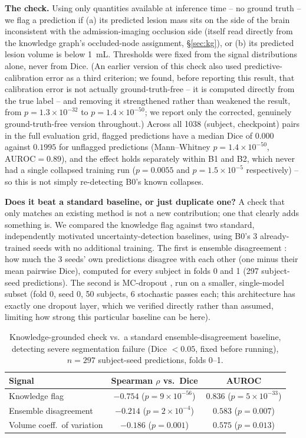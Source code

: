 \textbf{The check.} Using only quantities available at inference time -- no ground truth -- we flag a prediction if (a) its predicted lesion mass sits on the side of the brain inconsistent with the admission-imaging occlusion side (itself read directly from the knowledge graph's occluded-node assignment, \S\ref{sec:kg}), or (b) its predicted lesion volume is below 1~mL. Thresholds were fixed from the signal distributions alone, never from Dice. (An earlier version of this check also used predictive-calibration error as a third criterion; we found, before reporting this result, that calibration error is not actually ground-truth-free -- it is computed directly from the true label -- and removing it strengthened rather than weakened the result, from $p=1.3\times10^{-32}$ to $p=1.4\times10^{-50}$; we report only the corrected, genuinely ground-truth-free version throughout.) Across all 1038 (subject, checkpoint) pairs in the full evaluation grid, flagged predictions have a median Dice of $0.000$ against $0.1995$ for unflagged predictions (Mann--Whitney $p=1.4\times10^{-50}$, $\mathrm{AUROC}=0.89$), and the effect holds separately within B1 and B2, which never had a single collapsed training run ($p=0.0055$ and $p=1.5\times10^{-5}$ respectively) -- so this is not simply re-detecting B0's known collapses.

\textbf{Does it beat a standard baseline, or just duplicate one?} A check that only matches an existing method is not a new contribution; one that clearly adds something is. We compared the knowledge flag against two standard, independently motivated uncertainty-detection baselines, using B0's 3 already-trained seeds with no additional training. The first is ensemble disagreement \cite{lakshminarayanan2017}: how much the 3 seeds' own predictions disagree with each other (one minus their mean pairwise Dice), computed for every subject in folds 0 and 1 (297 subject-seed predictions). The second is MC-dropout \cite{gal2016dropout}, run on a smaller, single-model subset (fold 0, seed 0, 50 subjects, 6 stochastic passes each; this architecture has exactly one dropout layer, which we verified directly rather than assumed, limiting how strong this particular baseline can be here).

\begin{table}[t]
\centering
\caption{Knowledge-grounded check vs.\ a standard ensemble-disagreement baseline, detecting severe segmentation failure (Dice $<0.05$, fixed before running), $n=297$ subject-seed predictions, folds 0--1.}
\label{tab:faildetect}
\begin{tabular}{lcc}
\toprule
\textbf{Signal} & \textbf{Spearman $\rho$ vs.\ Dice} & \textbf{AUROC} \\
\midrule
Knowledge flag & $-0.754$ ($p=9\times10^{-56}$) & $\mathbf{0.836}$ ($p=5\times10^{-33}$) \\
Ensemble disagreement & $-0.214$ ($p=2\times10^{-4}$) & $0.583$ ($p=0.007$) \\
Volume coeff.\ of variation & $-0.186$ ($p=0.001$) & $0.575$ ($p=0.013$) \\
\bottomrule
\end{tabular}
\end{table}

